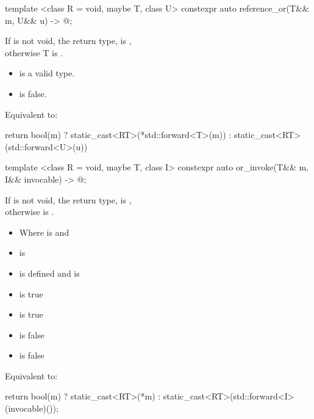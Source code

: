 %
\begin{itemdecl}
template <class R = void, maybe T, class U>
    constexpr auto reference_or(T&& m, U&& u) -> @\seebelow@;
\end{itemdecl}

\begin{itemdescr}
\pnum
If  is not void, the return type,  is , \\
otherwise T is .

\pnum
\mandates
\begin{itemize}
\item {} is a valid type.
\item {} is false.
\end{itemize}

\pnum
\effects
Equivalent to:
\begin{codeblock}
return  bool(m) ?
  static_cast<RT>(*std::forward<T>(m)) :
  static_cast<RT>(std::forward<U>(u))
\end{codeblock}

\end{itemdescr}

%
\begin{itemdecl}
template <class R = void, maybe T, class I>
    constexpr auto or_invoke(T&& m, I&& invocable) -> @\seebelow@;
\end{itemdecl}

\begin{itemdescr}
\pnum
If  is not void, the return type,  is , \\
otherwise  is .

\pnum
\mandates
\begin{itemize}
\item Where  is  and
\item {} is  
\item {} is defined and is 
\item {} is true
\item {} is true
\item {} is false
\item {} is false
\end{itemize}

\pnum
\effects
Equivalent to:
\begin{codeblock}
return bool(m) ?
  static_cast<RT>(*m) :
  static_cast<RT>(std::forward<I>(invocable)());
\end{codeblock}
\end{itemdescr}

